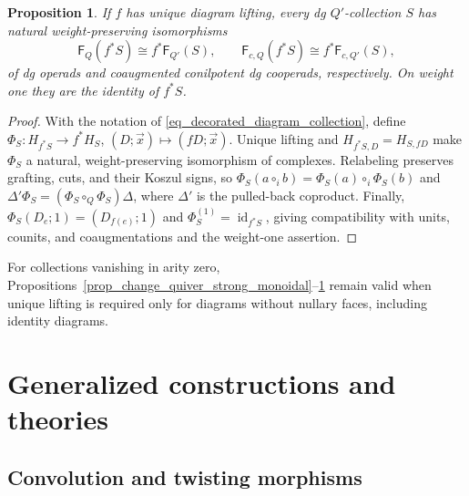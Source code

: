 \documentclass[11pt,letterpaper]{article}
\numberwithin{equation}{section}
\theoremstyle{plain}
\newtheorem{prop}[thm]{Proposition}
\theoremstyle{definition}
\theoremstyle{remark}
\newcommand{\id}{\operatorname{id}}
\begin{document}
\begin{prop}\label{prop_change_quiver_free_cofree}
If $f$ has unique diagram lifting, every dg $Q'$-collection $S$ has
natural weight-preserving isomorphisms
\begin{equation}\label{eq_change_quiver_free_cofree}
 \mathsf F_Q(f^*S)\cong f^*\mathsf F_{Q'}(S),
 \qquad
 \mathsf F_{c,Q}(f^*S)\cong f^*\mathsf F_{c,Q'}(S),
\end{equation}
of dg operads and coaugmented conilpotent dg cooperads, respectively.
On weight one they are the identity of $f^*S$.
\end{prop}
\begin{proof}
With the notation of \eqref{eq_decorated_diagram_collection}, define
$ \Phi_S:H_{f^*S} \to  f^*H_S$, $ (D;\vec x)\mapsto(fD;\vec x)$.
Unique lifting and $H_{f^*S,D}=H_{S,fD}$ make $\Phi_S$ a natural,
weight-preserving isomorphism of complexes. Relabeling preserves
grafting, cuts, and their Koszul signs, so
$ \Phi_S(a\circ_i b)=\Phi_S(a)\circ_i\Phi_S(b)$ and $ \Delta'\Phi_S=(\Phi_S\circ_Q\Phi_S)\Delta$,
where $\Delta'$ is the pulled-back coproduct. Finally,
$\Phi_S(D_e;1)=(D_{f(e)};1)$ and
$\Phi_S^{(1)}=\id_{f^*S}$, giving compatibility with units,
counits, and coaugmentations and the weight-one assertion.
\end{proof}

For collections vanishing in arity zero,
Propositions~\ref{prop_change_quiver_strong_monoidal}--\ref{prop_change_quiver_free_cofree}
remain valid when unique
lifting is required only for diagrams without nullary faces,
including identity diagrams.

\section{Generalized constructions and theories}
\label{s_generalized}


\subsection{Convolution and twisting morphisms}
\label{ss_convolution_twisting}
\end{document}

